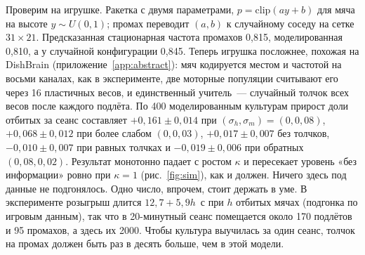 \documentclass[pre,twocolumn,superscriptaddress,showpacs=false,amsmath,amssymb,nofootinbib]{revtex4-2}
\begin{document}
Проверим на игрушке. Ракетка с двумя параметрами, $p=\mathrm{clip}(ay+b)$ для мяча на высоте $y\sim U(0,1)$; промах переводит $(a,b)$ к случайному соседу на сетке $31\times21$. Предсказанная стационарная частота промахов 0{,}815, моделированная 0{,}810, а у случайной конфигурации 0{,}845. Теперь игрушка посложнее, похожая на DishBrain (приложение~\ref{app:abstract}): мяч кодируется местом и частотой на восьми каналах, как в эксперименте, две моторные популяции считывают его через 16 пластичных весов, и единственный учитель~--- случайный толчок всех весов после каждого подлёта. По 400 моделированным культурам прирост доли отбитых за сеанс составляет $+0{,}161\pm0{,}014$ при $(\sigma_h,\sigma_m)=(0,0{,}08)$, $+0{,}068\pm0{,}012$ при более слабом $(0,0{,}03)$, $+0{,}017\pm0{,}007$ без толчков, $-0{,}010\pm0{,}007$ при равных толчках и $-0{,}019\pm0{,}006$ при обратных $(0{,}08,0{,}02)$. Результат монотонно падает с ростом $\kappa$ и пересекает уровень «без информации» ровно при $\kappa=1$ (рис.~\ref{fig:sim}), как и должен. Ничего здесь под данные не подгонялось. Одно число, впрочем, стоит держать в уме. В эксперименте розыгрыш длится $12{,}7+5{,}9h$~с при $h$ отбитых мячах (подгонка по игровым данным), так что в 20-минутный сеанс помещается около 170 подлётов и 95 промахов, а здесь их 2000. Чтобы культура выучилась за один сеанс, толчок на промах должен быть раз в десять больше, чем в этой модели.
\end{document}
